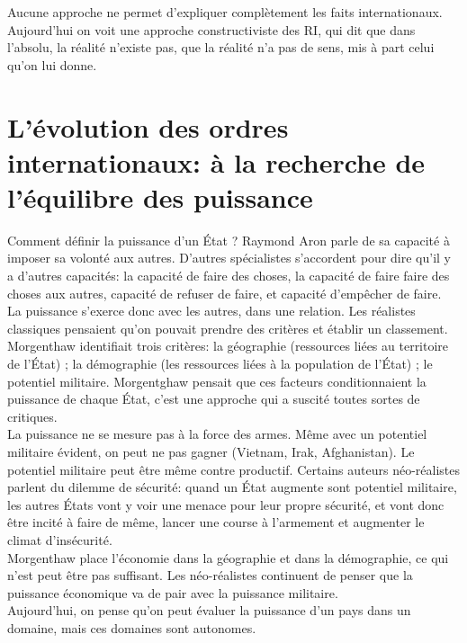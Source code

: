 \documentclass[10pt, a4paper, openany]{book}
\begin{document}
Aucune approche ne permet d'expliquer complètement les faits internationaux. Aujourd'hui on voit une approche constructiviste des RI, qui dit que dans l'absolu, la réalité n'existe pas, que la réalité n'a pas de sens, mis à part celui qu'on lui donne. 

\chapter{L'évolution des ordres internationaux: à la recherche de l'équilibre des puissance}

Comment définir la puissance d'un État ? Raymond Aron parle de sa capacité à imposer sa volonté aux autres. D'autres spécialistes s'accordent pour dire qu'il y a d'autres capacités: la capacité de faire des choses, la capacité de faire faire des choses aux autres, capacité de refuser de faire, et capacité d'empêcher de faire. \\
La puissance s'exerce donc avec les autres, dans une relation. Les réalistes classiques pensaient qu'on pouvait prendre des critères et établir un classement. Morgenthaw identifiait trois critères: la géographie (ressources liées au territoire de l'État) ; la démographie (les ressources liées à la population de l'État) ; le potentiel militaire. Morgentghaw pensait que ces facteurs conditionnaient la puissance de chaque État, c'est une approche qui a suscité toutes sortes de critiques. \\
La puissance ne se mesure pas à la force des armes. Même avec un potentiel militaire évident, on peut ne pas gagner (Vietnam, Irak, Afghanistan). Le potentiel militaire peut être même contre productif. Certains auteurs néo-réalistes parlent du dilemme de sécurité: quand un État augmente sont potentiel militaire, les autres États vont y voir une menace pour leur propre sécurité, et vont donc être incité à faire de même, lancer une course à l'armement et augmenter le climat d'insécurité. \\
Morgenthaw place l'économie dans la géographie et dans la démographie, ce qui n'est peut être pas suffisant. Les néo-réalistes continuent de penser que la puissance économique va de pair avec la puissance militaire. \\
Aujourd'hui, on pense qu'on peut évaluer la puissance d'un pays dans un domaine, mais ces domaines sont autonomes. 
\end{document}
